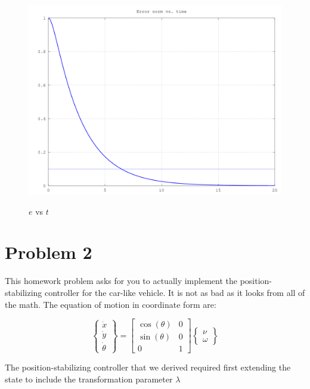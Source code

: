 \documentclass[10pt,a4paper]{article}
\begin{document}
\begin{figure}[H]
  \centering
  \includegraphics[angle = 0, scale = 0.3]{figures/Question1cErrors.png} 
  \label{fig:Q1cErrors}
  \caption{$e$ vs $t$}
\end{figure}

\section*{Problem 2}
This homework problem asks for you to actually implement the position-stabilizing controller for the car-like vehicle. It is not as bad as it looks from all of the math. The equation of motion in coordinate form are:

\[ \begin{Bmatrix}
   \dot{x} \\
   \dot{y} \\
   \dot{\theta} 
   \end{Bmatrix}
   =
  \begin{bmatrix}
  \cos (\theta) & 0 \\
  \sin (\theta) & 0 \\
  0 & 1
  \end{bmatrix}  
  \begin{Bmatrix}
  \nu \\
  \omega
  \end{Bmatrix}
\]

The position-stabilizing controller that we derived required first extending the state to include the transformation parameter $\lambda$
\end{document}
